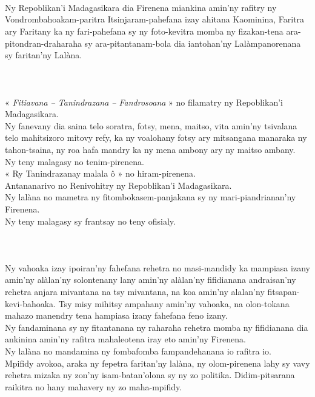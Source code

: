 \documentclass[12pt]{article}
\newcounter{laharana}
\newcommand{\andininy}[0]{
  \paragraph{%
    \NoCaseChange{%
      Andininy~\addtocounter{laharana}{1}\thelaharana.}\label{and:\thelaharana}~%
  }%
}
\begin{document}
\andininy{}Ny Repoblikan'i Madagasikara dia Firenena miankina amin'ny rafitry ny
Vondrombahoakam-paritra Itsinjaram-pahefana izay ahitana Kaominina, Faritra ary
Faritany ka ny fari-pahefana sy ny foto-kevitra momba ny fizakan-tena
ara-pitondran-draharaha sy ara-pitantanam-bola dia iantohan'ny Lalàmpanorenana
sy faritan'ny Lalàna.

\andininy{}« \emph{Fitiavana – Tanindrazana – Fandrosoana} » no filamatry ny
Repoblikan'i Madagasikara.\\

\noindent
Ny fanevany dia saina telo soratra, fotsy, mena, maitso, vita amin'ny tsivalana
telo mahitsizoro mitovy refy, ka ny voalohany fotsy ary mitsangana manaraka ny
tahon-tsaina, ny roa hafa mandry ka ny mena ambony ary ny maitso ambany.\\

\noindent
Ny teny malagasy no tenim-pirenena.\\

\noindent
« Ry Tanindrazanay malala ô » no hiram-pirenena.\\

\noindent
Antananarivo no Renivohitry ny Repoblikan'i Madagasikara.\\

\noindent
Ny lalàna no mametra ny fitombokasem-panjakana sy ny mari-piandrianan'ny
Firenena.\\

\noindent
Ny teny malagasy sy frantsay no teny ofisialy.

\andininy{}Ny vahoaka izay ipoiran'ny fahefana rehetra no masi-mandidy ka
mampiasa izany amin'ny alàlan'ny solontenany lany amin'ny alàlan'ny fifidianana
andraisan'ny rehetra anjara mivantana na tsy mivantana, na koa amin'ny alalan'ny
fitsapan-kevi-bahoaka. Tsy misy mihitsy ampahany amin'ny vahoaka, na olon-tokana
mahazo manendry tena hampiasa izany fahefana feno izany.\\

\noindent
Ny fandaminana sy ny fitantanana ny raharaha rehetra momba ny fifidianana dia
ankinina amin'ny rafitra mahaleotena iray eto amin'ny Firenena.\\

\noindent
Ny lalàna no mandamina ny fombafomba fampandehanana io rafitra io.\\

\noindent
Mpifidy avokoa, araka ny fepetra faritan'ny lalàna, ny olom-pirenena lahy sy
vavy rehetra mizaka ny zon'ny isam-batan'olona sy ny zo politika.
Didim-pitsarana raikitra no hany mahavery ny zo maha-mpifidy.
\end{document}
